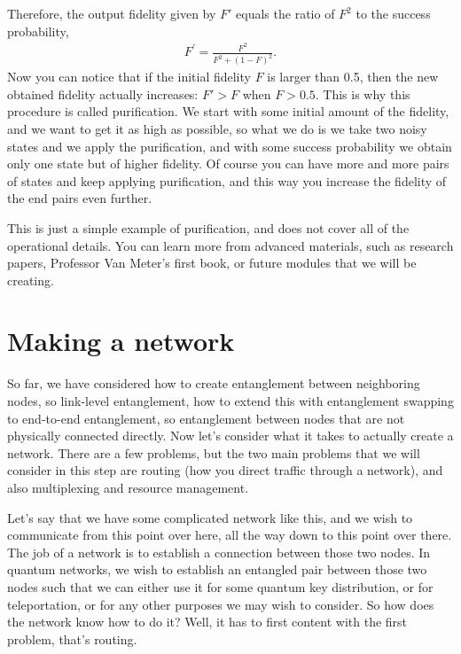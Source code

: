 Therefore, the output fidelity given by $F'$ equals the ratio of $F^2$ to the success probability,
\begin{align}
    F^{\prime}=\frac{F^{2}}{F^{2}+(1-F)^{2}}.
\end{align}
Now you can notice that if the initial fidelity $F$ is larger than 0.5, then the new obtained fidelity actually increases: $F' > F$ when $F > 0.5$. This is why this procedure is called purification. We start with some initial amount of the fidelity, and we want to get it as high as possible, so what we do is we take two noisy states and we apply the purification, and with some success probability we obtain only one state but of higher fidelity. Of course you can have more and more pairs of states and keep applying purification, and this way you increase the fidelity of the end pairs even further.

This is just a simple example of purification, and does not cover all of the operational details. You can learn more from advanced materials, such as research papers, Professor Van Meter's first book, or future modules that we will be creating.

\section{Making a network}


So far, we have considered how to create entanglement between neighboring nodes, so link-level entanglement, how to extend this with entanglement swapping to end-to-end entanglement, so entanglement between nodes that are not physically connected directly. Now let's consider what it takes to actually create a network. There are a few problems, but the two main problems that we will consider in this step are routing (how you direct traffic through a network), and also multiplexing and resource management.

Let's say that we have some complicated network like this, and we wish to communicate from this point over here, all the way down to this point over there. The job of a network is to establish a connection between those two nodes. In quantum networks, we wish to establish an entangled pair between those two nodes such that we can either use it for some quantum key distribution, or for teleportation, or for any other purposes we may wish to consider. So how does the network know how to do it? Well, it has to first content with the first problem, that's routing.

